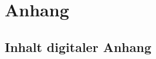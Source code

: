 \chapter{Anhang}
\label{appendix:A}
\setcounter{page}{9}
\renewcommand\thesection{\Alph{section}}
\renewcommand{\thefigure}{A.\arabic{figure}}
\renewcommand{\thetable}{A.\arabic{table}}

\newcommand{\nocontentsline}[3]{}
\newcommand{\tocless}[2]{\bgroup\let\addcontentsline=\nocontentsline#1{#2}\egroup}


\tocless\section{Inhalt digitaler Anhang}


\tocless\section{Tabellen}
